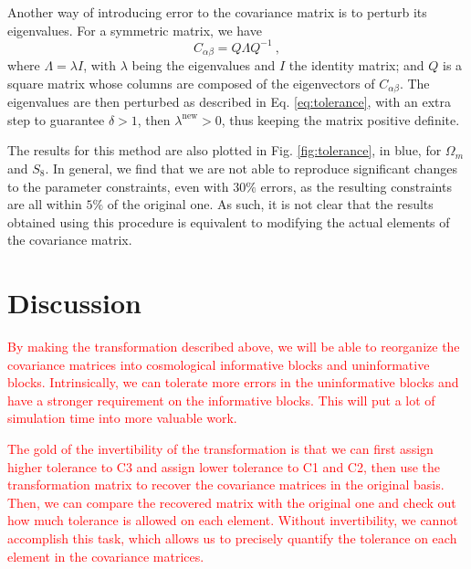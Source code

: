 \documentclass[twocolumn]{\docclass}
\newcommand{\rf}[1]{\ref{fig:#1}}
\newcommand\be{\begin{equation}}
\newcommand\ee{\end{equation}}
\begin{document}
	Another way of introducing error to the covariance matrix is to perturb its eigenvalues. For a symmetric matrix, we have
	\be
	C_{\alpha \beta} = Q\Lambda Q^{-1}\ ,
	\ee
	where $\Lambda = \lambda I$, with $\lambda$ being the eigenvalues and $I$ the identity matrix; and $Q$ is a square matrix whose columns are composed of the eigenvectors of $C_{\alpha \beta}$. The eigenvalues are then perturbed as described in Eq. \ref{eq:tolerance}, with an extra step to guarantee $\delta > 1$, then $\lambda^{\mathrm{new}} > 0$, thus keeping the matrix positive definite.
	
	The results for this method are also plotted in Fig. \rf{tolerance}, in blue, for $\Omega_m$ and $S_8$. In general, we find that we are not able to reproduce significant changes to the parameter constraints, even with $30\%$ errors, as the resulting constraints are all within $5\%$ of the original one. As such, it is not clear that the results obtained using this procedure is equivalent to modifying the actual elements of the covariance matrix. 
	
	
	
	
	
	
	
	\section{Discussion}
	\label{sec:discussion}
	
	
	\textcolor{red}{By making the transformation described above, we will be able to reorganize the covariance matrices into cosmological informative blocks and uninformative blocks. Intrinsically, we can tolerate more errors in the uninformative blocks and have a stronger requirement on the informative blocks. This will put a lot of simulation time into more valuable work.}
	
	\textcolor{red}{The gold of the invertibility of the transformation is that we can first assign higher tolerance to C3 and assign lower tolerance to C1 and C2, then use the transformation matrix to recover the covariance matrices in the original basis. Then, we can compare the recovered matrix with the original one and check out how much tolerance is allowed on each element. Without invertibility, we cannot accomplish this task, which allows us to precisely quantify the tolerance on each element in the covariance matrices.}
	
\end{document}
